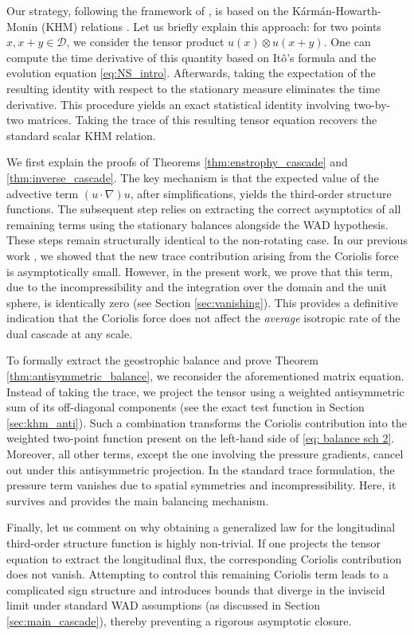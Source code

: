 \documentclass[11pt,a4paper]{article}
\numberwithin{equation}{section}
\numberwithin{theorem}{section}
\numberwithin{remark}{section}
\numberwithin{definition}{section}
\begin{document}
Our strategy, following the framework of \cite{bed2D, YuriAmiraliGigliola}, is based on the Kármán-Howarth-Monin (KHM) relations \cite{karman, monin}. Let us briefly explain this approach: for two points $x, x+y \in \mathcal{D}$, we consider the tensor product $u(x) \otimes u(x+y)$. One can compute the time derivative of this quantity based on Itô's formula and the evolution equation \eqref{eq:NS_intro}. Afterwards, taking the expectation of the resulting identity with respect to the stationary measure eliminates the time derivative. This procedure yields an exact statistical identity involving two-by-two matrices. Taking the trace of this resulting tensor equation recovers the standard scalar KHM relation. 

We first explain the proofs of Theorems \ref{thm:enstrophy_cascade} and \ref{thm:inverse_cascade}. The key mechanism is that the expected value of the advective term $(u \cdot \nabla)u$, after simplifications, yields the third-order structure functions. The subsequent step relies on extracting the correct asymptotics of all remaining terms using the stationary balances alongside the WAD hypothesis. These steps remain structurally identical to the non-rotating case. In our previous work \cite{YuriAmiraliGigliola}, we showed that the new trace contribution arising from the Coriolis force is asymptotically small. However, in the present work, we prove that this term, due to the incompressibility and the integration over the domain and the unit sphere, is identically zero (see Section \ref{sec:vanishing}). This provides a definitive indication that the Coriolis force does not affect the \textit{average} isotropic rate of the dual cascade at any scale. 

To formally extract the geostrophic balance and prove Theorem \ref{thm:antisymmetric_balance}, we reconsider the aforementioned matrix equation. Instead of taking the trace, we project the tensor using a weighted antisymmetric sum of its off-diagonal components (see the exact test function in Section \ref{sec:khm_anti}). Such a combination transforms the Coriolis contribution into the weighted two-point function present on the left-hand side of \eqref{eq: balance sch 2}. Moreover, all other terms, except the one involving the pressure gradients, cancel out under this antisymmetric projection. In the standard trace formulation, the pressure term vanishes due to spatial symmetries and incompressibility. Here, it survives and provides the main balancing mechanism. 

Finally, let us comment on why obtaining a generalized law for the longitudinal third-order structure function is highly non-trivial. If one projects the tensor equation to extract the longitudinal flux, the corresponding Coriolis contribution does not vanish. Attempting to control this remaining Coriolis term leads to a complicated sign structure and introduces bounds that diverge in the inviscid limit under standard WAD assumptions (as discussed in Section \ref{sec:main_cascade}), thereby preventing a rigorous asymptotic closure.
\end{document}
